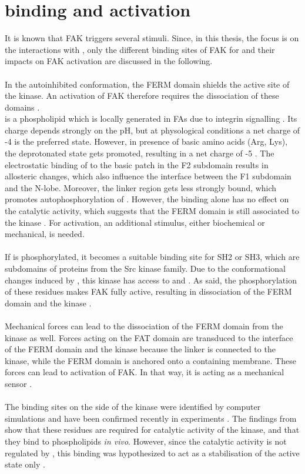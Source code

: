 \section{\pip{} binding and activation}
It is known that FAK triggers several stimuli. Since, in this thesis, the focus is on the interactions with \pip{}, only the different binding sites of FAK for \pip{} and their impacts on FAK activation are discussed in the following.\\
\\
In the autoinhibited conformation, the FERM domain shields the active site of the kinase. An activation of FAK therefore requires the dissociation of these domains \autocite{structFAK}.\\
\pip{} is a phospholipid which is locally generated in FAs due to integrin signalling \autocite{pip2LocalGeneration}. Its charge depends strongly on the pH, but at physological conditions a net charge of -4 is the preferred state. However, in presence of basic amino acids (Arg, Lys), the deprotonated state gets promoted, resulting in a net charge of -5 \autocite{pip2_minus5}. The electrostatic binding of \pip{} to the basic patch in the F2 subdomain results in allosteric changes, which also influence the interface between the F1 subdomain and the N-lobe. Moreover, the linker region gets less strongly bound, which promotes autophosphorylation of . However, the \pip{} binding alone has no effect on the catalytic activity, which suggests that the FERM domain is still associated to the kinase \autocites{pap001}{pap003}. For activation, an additional stimulus, either biochemical or mechanical, is needed.\\
\\
If  is phosphorylated, it becomes a suitable binding site for SH2 or SH3, which are subdomains of proteins from the Src kinase family. Due to the conformational changes induced by \pip{}, this kinase has access to  and . As said, the phosphorylation of these residues makes FAK fully active, resulting in dissociation of the FERM domain and the kinase \autocite{pap001}.\\
\\
Mechanical forces can lead to the dissociation of the FERM domain from the kinase as well. Forces acting on the FAT domain are transduced to the interface of the FERM domain and the kinase because the linker is connected to the kinase, while the FERM domain is anchored onto a \pip{} containing membrane. These forces can lead to activation of FAK. In that way, it is acting as a mechanical sensor \autocite{pap004}.\\
\\
The binding sites on the side of the kinase were identified by computer simulations \autocite{pap002} and have been confirmed recently in experiments \autocite{pap002Exp}. The findings from \textcite{pap002Exp} show that these residues are required for catalytic activity of the kinase, and that they bind to phospholipids \textit{in vivo}. However, since the catalytic activity is not regulated by \pip{}, this binding was hypothesized to act as a stabilisation of the active state only \autocite{pap002Exp}.
